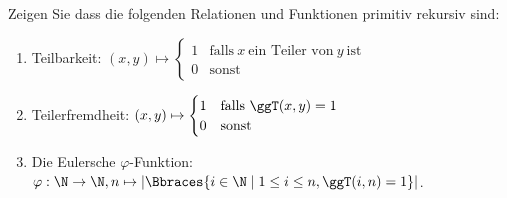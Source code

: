 
\begin{exercise}

Zeigen Sie dass die folgenden Relationen und Funktionen primitiv rekursiv sind:

\begin{enumerate}

    \item Teilbarkeit:
    $(x, y) \mapsto \begin{cases} 1 & \text{falls}~ x ~\text{ein Teiler von}~ y ~\text{ist} \\ 0 & \text{sonst} \end{cases}$

    \item Teilerfremdheit:
    $(x, y) \mapsto \begin{cases} 1 & \text{falls}~ \ggT(x, y) = 1 \\ 0 & \text{sonst} \end{cases}$

    \item Die Eulersche $\varphi$-Funktion:
    $\varphi: \N \to \N, n \mapsto |\Bbraces{i \in \N \mid 1 \leq i \leq n, \ggT(i, n) = 1}|$.

\end{enumerate}

\end{exercise}


